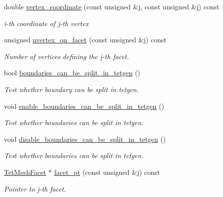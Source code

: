 \begin{DoxyCompactItemize}
double \hyperlink{classoomph_1_1TetMeshFacetedSurface_aad7ab6940be9b8ed2e73d80c238c5128}{vertex\+\_\+coordinate} (const unsigned \&j, const unsigned \&\hyperlink{cfortran_8h_adb50e893b86b3e55e751a42eab3cba82}{i}) const
\begin{DoxyCompactList}\small\item\em i-\/th coordinate of j-\/th vertex \end{DoxyCompactList}\item 
unsigned \hyperlink{classoomph_1_1TetMeshFacetedSurface_a03f007362dac8406ad9b7337f1887c9d}{nvertex\+\_\+on\+\_\+facet} (const unsigned \&j) const
\begin{DoxyCompactList}\small\item\em Number of vertices defining the j-\/th facet. \end{DoxyCompactList}\item 
bool \hyperlink{classoomph_1_1TetMeshFacetedSurface_a7f324fe118cd60222d64c5485c74f2a1}{boundaries\+\_\+can\+\_\+be\+\_\+split\+\_\+in\+\_\+tetgen} ()
\begin{DoxyCompactList}\small\item\em Test whether boundary can be split in tetgen. \end{DoxyCompactList}\item 
void \hyperlink{classoomph_1_1TetMeshFacetedSurface_aa4f46a7206332d355efb1de439bc08af}{enable\+\_\+boundaries\+\_\+can\+\_\+be\+\_\+split\+\_\+in\+\_\+tetgen} ()
\begin{DoxyCompactList}\small\item\em Test whether boundaries can be split in tetgen. \end{DoxyCompactList}\item 
void \hyperlink{classoomph_1_1TetMeshFacetedSurface_a4dde957835b3b2410f629cd72119a5af}{disable\+\_\+boundaries\+\_\+can\+\_\+be\+\_\+split\+\_\+in\+\_\+tetgen} ()
\begin{DoxyCompactList}\small\item\em Test whether boundaries can be split in tetgen. \end{DoxyCompactList}\item 
\hyperlink{classoomph_1_1TetMeshFacet}{Tet\+Mesh\+Facet} $\ast$ \hyperlink{classoomph_1_1TetMeshFacetedSurface_a901cc7080454c9b93ceccce863e08a4c}{facet\+\_\+pt} (const unsigned \&j) const
\begin{DoxyCompactList}\small\item\em Pointer to j-\/th facet. \end{DoxyCompactList}\item 

\end{DoxyCompactItemize}
